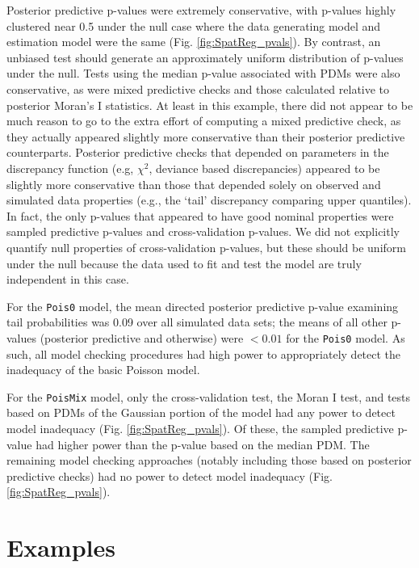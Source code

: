 \documentclass[12pt,english]{article}
\begin{document}
\begin{spacing}{1.9}
Posterior predictive p-values were extremely conservative, with p-values highly clustered near 0.5 under the null case where the data generating model and estimation model were the same (Fig. \ref{fig:SpatReg_pvals}).  By contrast, an unbiased test should generate an approximately uniform distribution of p-values under the null.  Tests using the median p-value associated with PDMs were also conservative, as were mixed predictive checks and those calculated relative to posterior Moran's I statistics.  At least in this example, there did not appear to be much reason to go to the extra effort of computing a mixed predictive check, as they actually appeared slightly more conservative than their posterior predictive counterparts.  Posterior predictive checks that depended on parameters in the discrepancy function (e.g, $\chi^2$, deviance based discrepancies) appeared to be slightly more conservative than those that depended solely on observed and simulated data properties (e.g., the `tail' discrepancy comparing upper quantiles).  In fact, the only p-values that appeared to have good nominal properties were sampled predictive p-values and cross-validation p-values.  We did not explicitly quantify null properties of cross-validation p-values, but these should be uniform under the null because the data used to fit and test the model are truly independent in this case.

For the \texttt{Pois0} model, the mean directed posterior predictive p-value examining tail probabilities was 0.09 over all simulated data sets; the means of all other p-values (posterior predictive and otherwise) were $<0.01$ for the \texttt{Pois0} model.  As such, all model checking procedures had high power to appropriately detect the inadequacy of the basic Poisson model.

For the \texttt{PoisMix} model, only the cross-validation test, the Moran I test, and tests based on PDMs of the Gaussian portion of the model had any power to detect model inadequacy (Fig. \ref{fig:SpatReg_pvals}).  Of these, the sampled predictive p-value had higher power than the p-value based on the median PDM.  The remaining model checking approaches (notably including those based on posterior predictive checks) had no power to detect model inadequacy (Fig. \ref{fig:SpatReg_pvals}).


\section{Examples}



\end{spacing}
\end{document}

